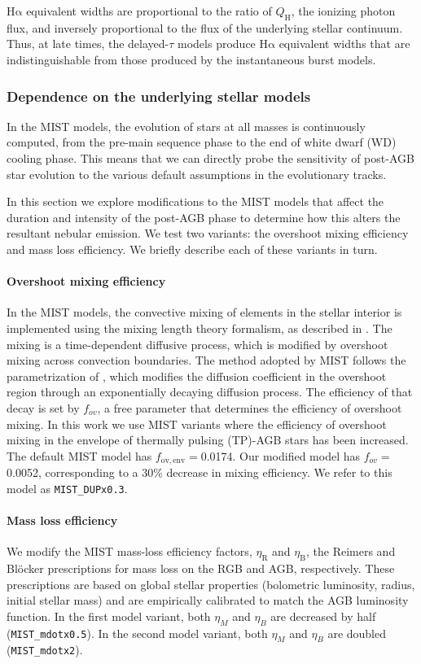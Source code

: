 \documentclass[preprint2]{aastex62}
\newcommand{\ha}{\ensuremath{\mathrm{H\alpha}}\xspace}
\newcommand{\QH}{\ensuremath{Q_{\mathrm{H}}}\xspace}
\begin{document}
\ha equivalent widths are proportional to the ratio of \QH, the ionizing photon flux, and inversely proportional to the flux of the underlying stellar continuum. Thus, at late times, the delayed-$\tau$ models produce \ha equivalent widths that are indistinguishable from those produced by the instantaneous burst models.

\subsubsection{Dependence on the underlying stellar models} \label{sec:stars:emis:isochrones}

In the MIST models, the evolution of stars at all masses is continuously computed, from the pre-main sequence phase to the end of white dwarf (WD) cooling phase. This means that we can directly probe the sensitivity of post-AGB star evolution to the various default assumptions in the evolutionary tracks.

In this section we explore modifications to the MIST models that affect the duration and intensity of the post-AGB phase to determine how this alters the resultant nebular emission. We test two variants: the overshoot mixing efficiency and mass loss efficiency. We briefly describe each of these variants in turn.

\paragraph{Overshoot mixing efficiency} In the MIST models, the convective mixing of elements in the stellar interior is implemented using the mixing length theory formalism, as described in \citet{Choi+2016}. The mixing is a time-dependent diffusive process, which is modified by overshoot mixing across convection boundaries. The method adopted by MIST follows the parametrization of \citet{Herwig+2000}, which modifies the diffusion coefficient in the overshoot region through an exponentially decaying diffusion process. The efficiency of that decay is set by $f_{ov}$, a free parameter that determines the efficiency of overshoot mixing. In this work we use MIST variants where the efficiency of overshoot mixing in the envelope of thermally pulsing (TP)-AGB stars has been increased. The default MIST model has $f_{\mathrm{ov, env}}=$0.0174. Our modified model has $f_{ov}=$0.0052, corresponding to a 30\% decrease in mixing efficiency. We refer to this model as {\tt MIST\_DUPx0.3}.

\paragraph{Mass loss efficiency} We modify the MIST mass-loss efficiency factors, $\eta_\mathrm{R}$ and $\eta_\mathrm{B}$, the Reimers and Bl{\"o}cker prescriptions for mass loss on the RGB and AGB, respectively. These prescriptions are based on global stellar properties (bolometric luminosity, radius, initial stellar mass) and are empirically calibrated to match the AGB luminosity function. In the first model variant, both $\eta_M$ and $\eta_B$ are decreased by half ({\tt MIST\_mdotx0.5}). In the second model variant, both $\eta_M$ and $\eta_B$ are doubled ({\tt MIST\_mdotx2}).
\end{document}
